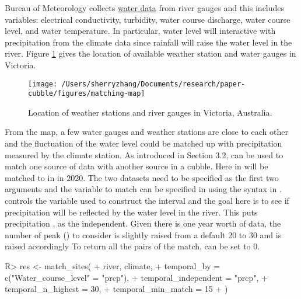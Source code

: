 \documentclass[
]{jss}
\begin{document}
Bureau of Meteorology collects
\href{http://www.bom.gov.au/metadata/catalogue/19115/ANZCW0503900528?template=full}{water
data} from river gauges and this includes variables: electrical
conductivity, turbidity, water course discharge, water course level, and
water temperature. In particular, water level will interactive with
precipitation from the climate data since rainfall will raise the water
level in the river. Figure \ref{fig:matching-map} gives the location of
available weather station and water gauges in Victoria.

\begin{CodeChunk}
\begin{figure}

{\centering \texttt{[image: /Users/sherryzhang/Documents/research/paper-cubble/figures/matching-map]} 

}

\caption[Location of weather stations and river gauges in Victoria, Australia]{Location of weather stations and river gauges in Victoria, Australia.}\label{fig:matching-map}
\end{figure}
\end{CodeChunk}

From the map, a few water gauges and weather stations are close to each
other and the fluctuation of the water level could be matched up with
precipitation measured by the climate station. As introduced in Section
3.2,  can be used to match one source of data with
another source in a cubble. Here  in
 will be matched to  in  in 2020.
The two datasets need to be specified as the first two arguments and the
variable to match can be specified in  using the
 syntax in .  controls
the variable used to construct the interval and the goal here is to see
if precipitation will be reflected by the water level in the river. This
puts precipitation , as the independent. Given there is one
year worth of data, the number of peak () to
consider is slightly raised from a default 20 to 30 and
 is raised accordingly To return all the pairs
of the match,  can be set to 0.

\begin{CodeChunk}
\begin{CodeInput}
R> res <- match_sites(
+   river, climate,
+   temporal_by = c("Water_course_level" = "prcp"),
+   temporal_independent = "prcp",  
+   temporal_n_highest = 30,
+   temporal_min_match = 15
+ )
\end{CodeInput}
\end{CodeChunk}
\end{document}
